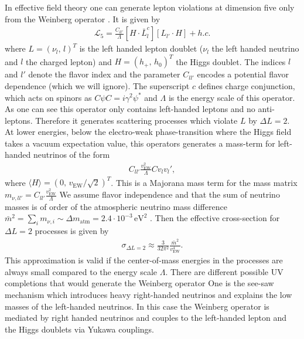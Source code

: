 \documentclass[13pt,a4paper,titlepage]{article}
\begin{document}
In effective field theory one can generate lepton violations at dimension five only from the
Weinberg operator \cite{Weinberg_operator_original_PhysRevLett.43.1566}. It is given by \cite[eq. 2]{Weinberg_at_colliders_Fuks_2021}
\begin{align}
\mathcal{L}_5 = \frac{C_{l l'}}{\Lambda} [H \cdot \bar{L}^c_l] [L_{l'} \cdot H] + h.c.
\end{align}
where $L = (\nu_l,\, l)^T$ is the left handed lepton doublet ($\nu_l$ the left handed neutrino and $l$ the charged lepton) and $H = (h_+,\, h_0)^T$ the Higgs doublet. The indices $l$ and $l'$ denote the flavor index and the parameter $C_{l l'}$ encodes a potential flavor dependence (which we will ignore).
The superscript $c$ defines charge conjunction, which acts on spinors as $C \psi C = i \gamma^2 \psi^*$
and $\Lambda$ is the energy scale of this operator.
As one can see this operator only contains left-handed leptons and no anti-leptons. Therefore
it generates scattering processes which violate $L$ by $\Delta L = 2$.
At lower energies, below the electro-weak phase-transition where the Higgs field takes a vacuum expectation value, this operators generates a mass-term for left-handed neutrinos of the form
\begin{align}
C_{ll'} \frac{v_{\mathrm{EW}}^2}{\Lambda} C v_l v_l',
\end{align}
where $\langle H \rangle = (0,\, v_{\mathrm{EW}} / \sqrt{2})^T$.
This is a Majorana mass term for the mass matrix $m_{\nu, ll'} = C_{ll'} \frac{v_{\mathrm{EW}}^2}{\Lambda}$
We assume flavor independence and that the sum of neutrino masses
is of order of the atmospheric neutrino mass difference $\bar{m}^2 = \sum_i m_{\nu, i} \sim \Delta m_{\mathrm{atm}} = 2.4 \cdot 10^{-3} \, \mathrm{eV}^2$ \cite{Kusenko_2015_Axion_Leptogenesis}.
Then the effective cross-section for $\Delta L = 2$ processes
is given by \cite[eq. 9]{Kusenko_2015_Axion_Leptogenesis}
\begin{align}
\label{eq:weinberg_rate}
\sigma_{\Delta L = 2} \approx \frac{3}{32 \pi^2} \frac{\bar{m}^2}{v_{\mathrm{EW}}^4}.
\end{align}
This approximation is valid if the center-of-mass energies in the processes are always small compared to the energy scale $\Lambda$.
There are different possible UV completions that would generate the Weinberg operator
One is the see-saw mechanism which introduces heavy right-handed neutrinos and explains the low masses of the left-handed neutrinos.
In this case the Weinberg operator is mediated by right handed neutrinos and
couples to the left-handed lepton and the Higgs doublets via Yukawa couplings.
\end{document}
